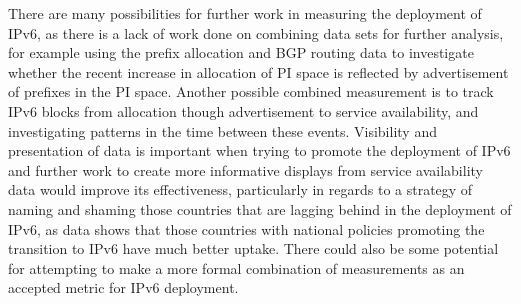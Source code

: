 There are many possibilities for further work in measuring the deployment of
IPv6, as there is a lack of work done on combining data sets for further
analysis, for example using the prefix allocation and BGP routing data to
investigate whether the recent increase in allocation of PI space is reflected by
advertisement of prefixes in the PI space. Another possible combined measurement
is to track IPv6 blocks from allocation though advertisement to service
availability, and investigating patterns in the time between these events.
Visibility and presentation of data is
important when trying to promote the deployment of IPv6 and further work to
create more informative displays from service availability data would improve
its effectiveness, particularly in regards to a strategy of naming and shaming
those countries that are lagging behind in the deployment of IPv6, as data shows
that those countries with national policies promoting the transition to IPv6
have much better uptake\cite{olivier_mj_crepin-leblond_ipv6_2011}. There could
also be some potential for
attempting to make a more formal combination of measurements as an accepted
metric for IPv6 deployment.




